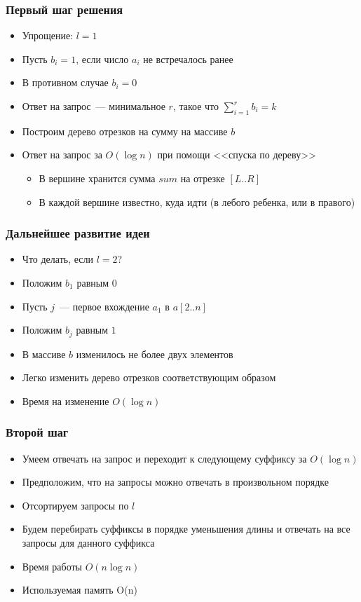 \begin{frame}
  \frametitle{Первый шаг решения}
  \begin{itemize}
    \item Упрощение: $l = 1$
    \item Пусть $b_i = 1$, если число $a_i$ не встречалось ранее
    \item В противном случае $b_i = 0$
    \item Ответ на запрос~--- минимальное $r$, такое что $\sum_{i=1}^r{b_i} = k$
    \item Построим дерево отрезков на сумму на массиве $b$
    \item Ответ на запрос за $O(\log n)$ при помощи <<спуска по дереву>>
      \begin{itemize}
        \item В вершине хранится сумма $sum$ на отрезке $[L..R]$                  
        \item В каждой вершине известно, куда идти (в лебого ребенка, или в правого)
      \end{itemize}
  \end{itemize}
\end{frame}

\begin{frame}
  \frametitle{Дальнейшее развитие идеи}
  \begin{itemize}
    \item Что делать, если $l=2$?
    \item Положим $b_1$ равным $0$
    \item Пусть $j$~--- первое вхождение $a_1$ в $a[2..n]$
    \item Положим $b_j$ равным $1$
    \item В массиве $b$ изменилось не более двух элементов
    \item Легко изменить дерево отрезков соответствующим образом
    \item Время на изменение $O(\log n)$
  \end{itemize}
\end{frame}


\begin{frame}
  \frametitle{Второй шаг}
  \begin{itemize}
    \item Умеем отвечать на запрос и переходит к следующему суффиксу за $O(\log n)$
    \item Предположим, что на запросы можно отвечать в произвольном порядке
    \item Отсортируем запросы по $l$
    \item Будем перебирать суффиксы в порядке уменьшения длины и отвечать на все запросы для данного суффикса
    \item Время работы $O(n \log n)$
    \item Используемая память O(n)
  \end{itemize}
\end{frame}


